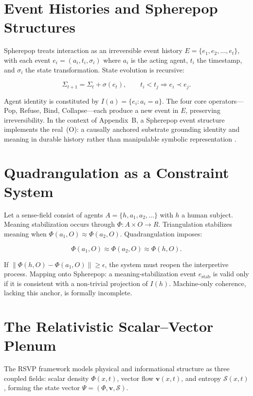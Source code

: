 \documentclass[12pt,a4paper]{article}
\begin{document}
\section{Event Histories and Spherepop Structures}

Spherepop treats interaction as an irreversible event history
$E = \{e_1, e_2, \dots, e_t\}$, with each event $e_i = (a_i, t_i, \sigma_i)$ where $a_i$
is the acting agent, $t_i$ the timestamp, and $\sigma_i$ the state transformation. State
evolution is recursive:

\[
\Sigma_{t+1} = \Sigma_t + \sigma(e_t), \qquad t_i < t_j \Rightarrow e_i \prec e_j.
\]

Agent identity is constituted by $I(a) = \{e_i : a_i = a\}$. The four core operators---Pop,
Refuse, Bind, Collapse---each produce a new event in $E$, preserving irreversibility.
In the context of Appendix~B, a Spherepop event structure implements the real~(O): a causally
anchored substrate grounding identity and meaning in durable history rather than manipulable
symbolic representation \citep{jelinek2026}.

\section{Quadrangulation as a Constraint System}

Let a sense-field consist of agents $A = \{h, a_1, a_2, \dots\}$ with $h$ a human subject.
Meaning stabilization occurs through $\Phi : A \times O \to R$. Triangulation stabilizes
meaning when $\Phi(a_1, O) \approx \Phi(a_2, O)$. Quadrangulation \citep{jelinek2026}
imposes:

\[
\Phi(a_1,O) \approx \Phi(a_2,O) \approx \Phi(h,O).
\]

If $\|\Phi(h,O) - \Phi(a_1,O)\| \geq \epsilon$, the system must reopen the interpretive
process. Mapping onto Spherepop: a meaning-stabilization event $e_{\mathrm{stab}}$ is valid
only if it is consistent with a non-trivial projection of $I(h)$. Machine-only coherence,
lacking this anchor, is formally incomplete.

\section{The Relativistic Scalar--Vector Plenum}

The RSVP framework models physical and informational structure as three coupled fields:
scalar density $\Phi(x,t)$, vector flow $\mathbf{v}(x,t)$, and entropy
$\mathcal{S}(x,t)$, forming the state vector $\Psi = (\Phi, \mathbf{v}, \mathcal{S})$.
\end{document}
